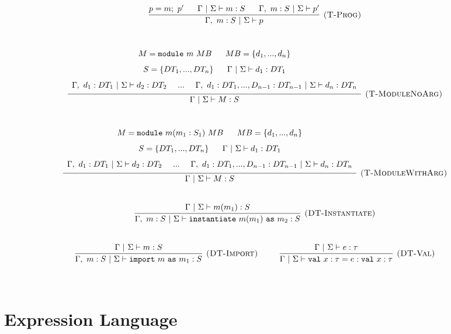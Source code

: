 \documentclass{llncs}
\newcommand{\keywadj}[1]{\mathtt{#1}}
\newcommand{\keyw}[1]{\keywadj{#1}~}
\begin{document}
\[\begin{array}{c}
\infer[\textsc{(T-Prog)}]
  {\Gamma,~m : S~|~\Sigma \vdash p}
  {p = m;~p'~~~~~\Gamma~|~\Sigma \vdash m : S~~~~~\Gamma,~m : S~|~\Sigma \vdash p'}\\[5ex]

\infer[\textsc{(T-ModuleNoArg)}]
  {\Gamma~|~\Sigma \vdash M : S}
  {\def\arraystretch{1.6}
  \begin{array}{c}
M = \keyw{module} m~MB~~~~~MB = \{d_1, ..., d_n\}\\
S = \{DT_1, ..., DT_n\}~~~~~\Gamma~|~\Sigma \vdash d_1 : DT_1 \\
\Gamma,~d_1 : DT_1~|~\Sigma \vdash d_2 : DT_2~~~~...~~~~\Gamma,~d_1 : DT_1, ..., D_{n-1} : DT_{n-1} ~|~\Sigma \vdash d_n : DT_n
  \end{array}}\\[5ex]

\infer[\textsc{(T-ModuleWithArg)}]
  {\Gamma~|~\Sigma \vdash M : S}
  {\def\arraystretch{1.6}
  \begin{array}{c}
M = \keyw{module} m(m_1 : S_1)~MB~~~~~MB = \{d_1, ..., d_n\}\\
S = \{DT_1, ..., DT_n\}~~~~~\Gamma~|~\Sigma \vdash d_1 : DT_1 \\
\Gamma,~d_1 : DT_1~|~\Sigma \vdash d_2 : DT_2~~~~...~~~~\Gamma,~d_1 : DT_1, ..., D_{n-1} : DT_{n-1} ~|~\Sigma \vdash d_n : DT_n
  \end{array}}\\[5ex]

%
%

\infer[\textsc{(DT-Instantiate)}]
  {\Gamma,~m : S~|~\Sigma \vdash \keyw{instantiate} m(m_1)~\keyw{as} m_2 : S}
  {\Gamma~|~\Sigma \vdash m(m_1) : S}\\[5ex]

\infer[\textsc{(DT-Import)}]
  {\Gamma,~m : S~|~\Sigma \vdash \keyw{import} m~\keyw{as} m_1 : S}
  {\Gamma~|~\Sigma \vdash m : S}
~~~~~~~~
\infer[\textsc{(DT-Val)}]
  {\Gamma~|~\Sigma \vdash \keyw{val} x : \tau = e : \keyw{val} x : \tau}
  {\Gamma~|~\Sigma \vdash e : \tau}\\[5ex]

\end{array}
\]

\newpage

\section{Expression Language}
\end{document}
